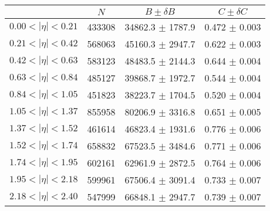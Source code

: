 \begin{tabular}{lccc}
\hline
    &   $N$   & $B \pm \delta B$  &  $C \pm \delta C$ \\
\hline
$0.00 < |\eta| <0.21$          & 433308     & 34862.3    $\pm$ 1787.9 & 0.472      $\pm$ 0.003 \\
$0.21 < |\eta| <0.42$          & 568063     & 45160.3    $\pm$ 2947.7 & 0.622      $\pm$ 0.003 \\
$0.42 < |\eta| <0.63$          & 583123     & 48483.5    $\pm$ 2144.3 & 0.644      $\pm$ 0.004 \\
$0.63 < |\eta| <0.84$          & 485127     & 39868.7    $\pm$ 1972.7 & 0.544      $\pm$ 0.004 \\
$0.84 < |\eta| <1.05$          & 451823     & 38223.7    $\pm$ 1704.5 & 0.520      $\pm$ 0.004 \\
$1.05 < |\eta| <1.37$          & 855958     & 80206.9    $\pm$ 3316.8 & 0.651      $\pm$ 0.005 \\
$1.37 < |\eta| <1.52$          & 461614     & 46823.4    $\pm$ 1931.6 & 0.776      $\pm$ 0.006 \\
$1.52 < |\eta| <1.74$          & 658832     & 67523.5    $\pm$ 3484.6 & 0.771      $\pm$ 0.006 \\
$1.74 < |\eta| <1.95$          & 602161     & 62961.9    $\pm$ 2872.5 & 0.764      $\pm$ 0.006 \\
$1.95 < |\eta| <2.18$          & 599961     & 67506.4    $\pm$ 3091.4 & 0.733      $\pm$ 0.007 \\
$2.18 < |\eta| <2.40$          & 547999     & 66848.1    $\pm$ 2947.7 & 0.739      $\pm$ 0.007 \\
\hline
\end{tabular}

